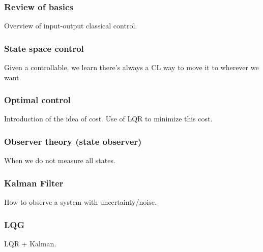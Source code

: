 
\subsubsection*{Review of basics}

Overview of input-output classical control.

\subsubsection*{State space control}

Given a controllable, we learn there's always a CL way to move it to wherever we want.

\subsubsection*{Optimal control}

Introduction of the idea of cost. Use of LQR to minimize this cost.

\subsubsection*{Observer theory (state observer)}

When we do not measure all states.

\subsubsection*{Kalman Filter}

How to observe a system with uncertainty/noise.

\subsubsection*{LQG}

LQR + Kalman.

